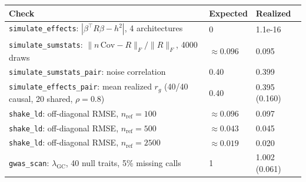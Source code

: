 \begin{tabular}{lll}
\toprule
Check & Expected & Realized \\
\midrule
\texttt{simulate\_effects}: $|\beta^\top R\beta - h^2|$, 4 architectures & 0 & 1.1e-16 \\
\texttt{simulate\_sumstats}: $\|n\,\widehat{\mathrm{Cov}} - R\|_F/\|R\|_F$, 4000 draws & $\approx 0.096$ & 0.095 \\
\texttt{simulate\_sumstats\_pair}: noise correlation & 0.40 & 0.399 \\
\texttt{simulate\_effects\_pair}: mean realized $r_g$ (40/40 causal, 20 shared, $\rho=0.8$) & 0.40 & 0.395 (0.160) \\
\texttt{shake\_ld}: off-diagonal RMSE, $n_{\mathrm{ref}}=100$ & $\approx0.096$ & 0.097 \\
\texttt{shake\_ld}: off-diagonal RMSE, $n_{\mathrm{ref}}=500$ & $\approx0.043$ & 0.045 \\
\texttt{shake\_ld}: off-diagonal RMSE, $n_{\mathrm{ref}}=2500$ & $\approx0.019$ & 0.020 \\
\texttt{gwas\_scan}: $\lambda_{\mathrm{GC}}$, 40 null traits, 5\% missing calls & 1 & 1.002 (0.061) \\
\bottomrule
\end{tabular}
